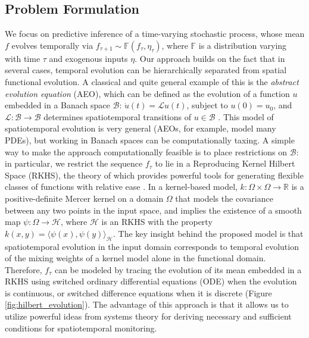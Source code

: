 \documentclass[letterpaper,12pt,peerreviewca,draftcls]{IEEEtran}
\newcommand{\R}{\mathbb{R}}
\newcommand{\fspace}{\mathcal{H}}
\newcommand{\fmap}{\psi}
\newcommand{\kernel}{k}
\newcommand{\dom}{\Omega}
\newcommand{\Kiprod}[2]{\langle \fmap(#1),\fmap(#2) \rangle_{\fspace}}
\newcommand{\tindex}{\tau}
\newcommand{\banachspace}{\mathcal{B}}
\newcommand{\banachop}{\mathcal{L}}
\newcommand{\banachfunc}{u}
\begin{document}
\subsection{Problem Formulation}\label{sec:formulation}
We focus on predictive inference of a time-varying stochastic process, whose mean $f$ evolves temporally via $f_{\tindex+1} \sim \mathbb{F}(f_{\tindex},\eta_{\tindex})$, where $\mathbb{F}$ is a distribution varying with time $\tindex$ and exogenous inputs $\eta$. Our approach builds on the fact that in several cases, temporal evolution can be hierarchically separated from spatial functional evolution. A classical and quite general example of this is the \emph{abstract evolution equation} (AEO), which can be defined as the evolution of a function $\banachfunc$ embedded in a Banach space $\banachspace$: $\dot{\banachfunc}(t) = \banachop\banachfunc(t)$, subject to $\banachfunc(0)= \banachfunc_0$, and $\banachop:\banachspace\to\banachspace$ determines spatiotemporal transitions of $\banachfunc\in\banachspace$ \cite{brezis2010functional}. This model of spatiotemporal evolution is very general (AEOs, for example, model many PDEs), but working in Banach spaces can be computationally taxing.  A simple way to make the approach computationally feasible is to place restrictions on $\banachspace$: in particular, we restrict the sequence $f_{\tindex}$ to lie in a Reproducing Kernel Hilbert Space (RKHS), the theory of which provides powerful tools for generating flexible classes of functions with relative ease \cite{RasmussenWilliams2005}.
In a kernel-based model, $\kernel:\dom\times\dom\to\R$ is a positive-definite Mercer kernel on a domain $\dom$ that models the covariance between any two points in the input space,  
and implies the existence of a smooth map $\fmap:\dom\to\fspace$, where $\fspace$ is an RKHS with the property $\kernel(x,y) = \Kiprod{x}{y}$. The key insight behind the proposed model is that spatiotemporal evolution in the input domain corresponds to temporal evolution of the mixing weights of a kernel model alone in the functional domain. Therefore, $f_{\tindex}$ can be modeled by tracing the evolution of its mean embedded in a RKHS using switched ordinary differential equations (ODE) when the evolution is continuous, or switched difference equations when it is discrete (Figure \ref{fig:hilbert_evolution}). 
The advantage of this approach is that it allows us to utilize powerful ideas from systems theory for deriving necessary and sufficient conditions for spatiotemporal monitoring. 
\end{document}
